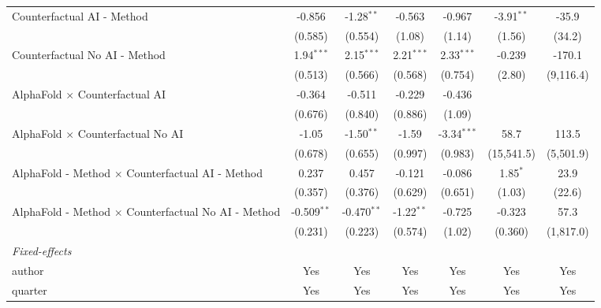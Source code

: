 \begin{tabular}{lcccccc}
   Counterfactual AI - Method                                 & -0.856        & -1.28$^{**}$  & -0.563       & -0.967        & -3.91$^{**}$ & -35.9\\   
                                                              & (0.585)       & (0.554)       & (1.08)       & (1.14)        & (1.56)       & (34.2)\\   
   Counterfactual No AI - Method                              & 1.94$^{***}$  & 2.15$^{***}$  & 2.21$^{***}$ & 2.33$^{***}$  & -0.239       & -170.1\\   
                                                              & (0.513)       & (0.566)       & (0.568)      & (0.754)       & (2.80)       & (9,116.4)\\   
   AlphaFold $\times$ Counterfactual AI                       & -0.364        & -0.511        & -0.229       & -0.436        &              &   \\   
                                                              & (0.676)       & (0.840)       & (0.886)      & (1.09)        &              &   \\   
   AlphaFold $\times$ Counterfactual No AI                    & -1.05         & -1.50$^{**}$  & -1.59        & -3.34$^{***}$ & 58.7         & 113.5\\   
                                                              & (0.678)       & (0.655)       & (0.997)      & (0.983)       & (15,541.5)   & (5,501.9)\\   
   AlphaFold - Method $\times$ Counterfactual AI - Method     & 0.237         & 0.457         & -0.121       & -0.086        & 1.85$^{*}$   & 23.9\\   
                                                              & (0.357)       & (0.376)       & (0.629)      & (0.651)       & (1.03)       & (22.6)\\   
   AlphaFold - Method $\times$ Counterfactual No AI - Method  & -0.509$^{**}$ & -0.470$^{**}$ & -1.22$^{**}$ & -0.725        & -0.323       & 57.3\\   
                                                              & (0.231)       & (0.223)       & (0.574)      & (1.02)        & (0.360)      & (1,817.0)\\   
   \midrule
   \emph{Fixed-effects}\\
   author                                                     & Yes           & Yes           & Yes          & Yes           & Yes          & Yes\\  
   quarter                                                    & Yes           & Yes           & Yes          & Yes           & Yes          & Yes\\  

\end{tabular}
